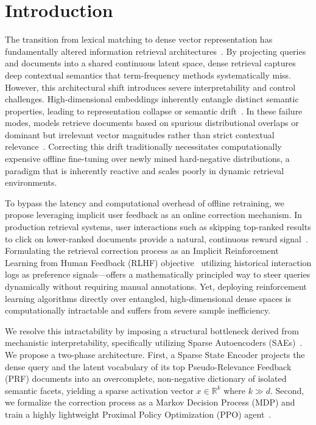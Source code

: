 \section{Introduction}

The transition from lexical matching to dense vector representation has fundamentally altered information retrieval architectures~\citep{karpukhin2020, izacard2022}. By projecting queries and documents into a shared continuous latent space, dense retrieval captures deep contextual semantics that term-frequency methods systematically miss. However, this architectural shift introduces severe interpretability and control challenges. High-dimensional embeddings inherently entangle distinct semantic properties, leading to representation collapse or semantic drift~\citep{zhan2021}. In these failure modes, models retrieve documents based on spurious distributional overlaps or dominant but irrelevant vector magnitudes rather than strict contextual relevance~\citep{thakur2021}. Correcting this drift traditionally necessitates computationally expensive offline fine-tuning over newly mined hard-negative distributions, a paradigm that is inherently reactive and scales poorly in dynamic retrieval environments.

To bypass the latency and computational overhead of offline retraining, we propose leveraging implicit user feedback as an online correction mechanism. In production retrieval systems, user interactions such as skipping top-ranked results to click on lower-ranked documents provide a natural, continuous reward signal~\citep{joachims2002, afsar2022}. Formulating the retrieval correction process as an Implicit Reinforcement Learning from Human Feedback (RLHF) objective~\citep{christiano2017} utilizing historical interaction logs as preference signals—offers a mathematically principled way to steer queries dynamically without requiring manual annotations. Yet, deploying reinforcement learning algorithms directly over entangled, high-dimensional dense spaces is computationally intractable and suffers from severe sample inefficiency. 

We resolve this intractability by imposing a structural bottleneck derived from mechanistic interpretability, specifically utilizing Sparse Autoencoders (SAEs)~\citep{cunningham2024, elhage2022, bricken2023}. We propose a two-phase architecture. First, a Sparse State Encoder projects the dense query and the latent vocabulary of its top Pseudo-Relevance Feedback (PRF) documents into an overcomplete, non-negative dictionary of isolated semantic facets, yielding a sparse activation vector $x \in \mathbb{R}^k$ where $k \gg d$. Second, we formalize the correction process as a Markov Decision Process (MDP) and train a highly lightweight Proximal Policy Optimization (PPO) agent~\citep{schulman2017}.

